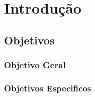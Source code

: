 \chapter*[Introdução]{Introdução}
\section{Objetivos}
\subsection{Objetivo Geral}
\subsection{Objetivos Especificos}